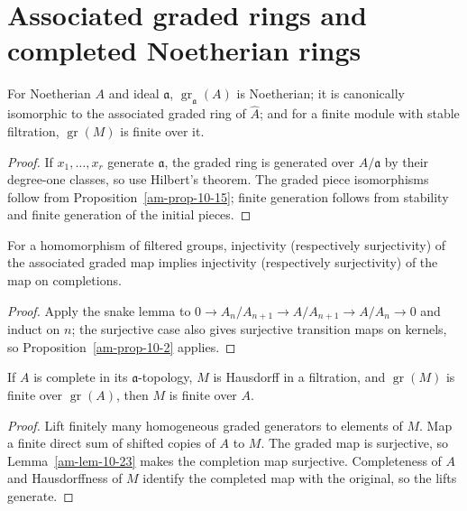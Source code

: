 \section{Associated graded rings and completed Noetherian rings}
\label{am-ch10-graded-completion}
\begin{proposition}
\label{am-prop-10-22}
\uses{}
For Noetherian $A$ and ideal $\mathfrak{a}$, $\operatorname{gr}_{\mathfrak{a}}(A)$ is
Noetherian; it is canonically isomorphic to the associated graded ring of
$\widehat A$; and for a finite module with stable filtration,
$\operatorname{gr}(M)$ is finite over it.
\end{proposition}
\begin{proof}
If $x_1,\ldots,x_r$ generate $\mathfrak{a}$, the graded ring is generated over
$A/\mathfrak{a}$ by their degree-one classes, so use Hilbert's theorem.  The graded
piece isomorphisms follow from Proposition~\ref{am-prop-10-15}; finite
generation follows from stability and finite generation of the initial pieces.
\end{proof}
\begin{lemma}
\label{am-lem-10-23}
\uses{}
For a homomorphism of filtered groups, injectivity (respectively surjectivity)
of the associated graded map implies injectivity (respectively surjectivity) of
the map on completions.
\end{lemma}
\begin{proof}
Apply the snake lemma to
$0\to A_n/A_{n+1}\to A/A_{n+1}\to A/A_n\to0$ and induct on $n$; the
surjective case also gives surjective transition maps on kernels, so
Proposition~\ref{am-prop-10-2} applies.
\end{proof}
\begin{proposition}
\label{am-prop-10-24}
\uses{}
If $A$ is complete in its $\mathfrak{a}$-topology, $M$ is Hausdorff in a filtration,
and $\operatorname{gr}(M)$ is finite over $\operatorname{gr}(A)$, then $M$ is
finite over $A$.
\end{proposition}
\begin{proof}
Lift finitely many homogeneous graded generators to elements of $M$.  Map a
finite direct sum of shifted copies of $A$ to $M$.  The graded map is surjective,
so Lemma~\ref{am-lem-10-23} makes the completion map surjective.  Completeness
of $A$ and Hausdorffness of $M$ identify the completed map with the original,
so the lifts generate.
\end{proof}
